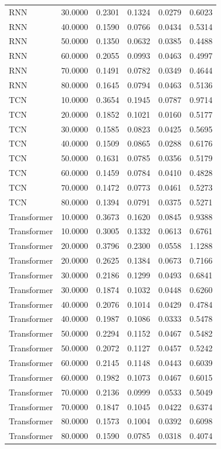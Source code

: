 \begin{tabular}{lrrrrr}
RNN & 30.0000 & 0.2301 & 0.1324 & 0.0279 & 0.6023 \\
RNN & 40.0000 & 0.1590 & 0.0766 & 0.0434 & 0.5314 \\
RNN & 50.0000 & 0.1350 & 0.0632 & 0.0385 & 0.4488 \\
RNN & 60.0000 & 0.2055 & 0.0993 & 0.0463 & 0.4997 \\
RNN & 70.0000 & 0.1491 & 0.0782 & 0.0349 & 0.4644 \\
RNN & 80.0000 & 0.1645 & 0.0794 & 0.0463 & 0.5136 \\
TCN & 10.0000 & 0.3654 & 0.1945 & 0.0787 & 0.9714 \\
TCN & 20.0000 & 0.1852 & 0.1021 & 0.0160 & 0.5177 \\
TCN & 30.0000 & 0.1585 & 0.0823 & 0.0425 & 0.5695 \\
TCN & 40.0000 & 0.1509 & 0.0865 & 0.0288 & 0.6176 \\
TCN & 50.0000 & 0.1631 & 0.0785 & 0.0356 & 0.5179 \\
TCN & 60.0000 & 0.1459 & 0.0784 & 0.0410 & 0.4828 \\
TCN & 70.0000 & 0.1472 & 0.0773 & 0.0461 & 0.5273 \\
TCN & 80.0000 & 0.1394 & 0.0791 & 0.0375 & 0.5271 \\
Transformer & 10.0000 & 0.3673 & 0.1620 & 0.0845 & 0.9388 \\
Transformer & 10.0000 & 0.3005 & 0.1332 & 0.0613 & 0.6761 \\
Transformer & 20.0000 & 0.3796 & 0.2300 & 0.0558 & 1.1288 \\
Transformer & 20.0000 & 0.2625 & 0.1384 & 0.0673 & 0.7166 \\
Transformer & 30.0000 & 0.2186 & 0.1299 & 0.0493 & 0.6841 \\
Transformer & 30.0000 & 0.1874 & 0.1032 & 0.0448 & 0.6260 \\
Transformer & 40.0000 & 0.2076 & 0.1014 & 0.0429 & 0.4784 \\
Transformer & 40.0000 & 0.1987 & 0.1086 & 0.0333 & 0.5478 \\
Transformer & 50.0000 & 0.2294 & 0.1152 & 0.0467 & 0.5482 \\
Transformer & 50.0000 & 0.2072 & 0.1127 & 0.0457 & 0.5242 \\
Transformer & 60.0000 & 0.2145 & 0.1148 & 0.0443 & 0.6039 \\
Transformer & 60.0000 & 0.1982 & 0.1073 & 0.0467 & 0.6015 \\
Transformer & 70.0000 & 0.2136 & 0.0999 & 0.0533 & 0.5049 \\
Transformer & 70.0000 & 0.1847 & 0.1045 & 0.0422 & 0.6374 \\
Transformer & 80.0000 & 0.1573 & 0.1004 & 0.0392 & 0.6098 \\
Transformer & 80.0000 & 0.1590 & 0.0785 & 0.0318 & 0.4074 \\
\bottomrule
\end{tabular}
